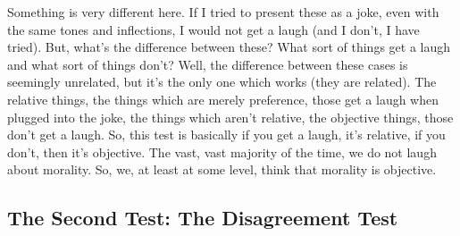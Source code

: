 
Something is very different here. If I tried to present these as a joke, even with the same tones and inflections, I would not get a laugh (and I don't, I have tried). But, what's the difference between these? What sort of things get a laugh and what sort of things don't? Well, the difference between these cases is seemingly unrelated, but it's the only one which works (they are related). The relative things, the things which are merely preference, those get a laugh when plugged into the joke, the things which aren't relative, the objective things, those don't get a laugh.  So, this test is basically if you get a laugh, it's relative, if you don't, then it's objective. The vast, vast majority of the time, we do not laugh about morality. So, we, at least at some level, think that morality is objective. 
\subsection{The Second Test: The Disagreement Test}

